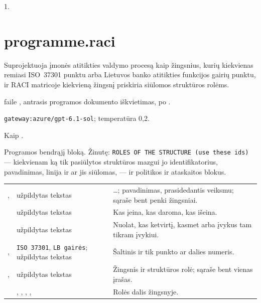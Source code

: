  1.


\section{programme.raci}\label{sec:aprompts:programme-raci}

 Suprojektuoja įmonės atitikties valdymo procesą kaip žingsnius,
kurių kiekvienas remiasi ISO~37301 punktu arba Lietuvos banko atitikties funkcijos gairių
punktu, ir RACI matricoje kiekvieną žingsnį priskiria siūlomos struktūros rolėms.

  faile , antrasis
programos dokumento iškvietimas, po .

 \texttt{gateway:azure/gpt-6.1-sol}; temperatūra 0,2.

 Kaip .

 Programos bendrąjį bloką. Žinutę:
\texttt{ROLES OF THE STRUCTURE (use these ids)} --- kiekvienam ką tik pasiūlytos struktūros
mazgui jo identifikatorius, pavadinimas, linija ir ar jis siūlomas, --- ir
 politikos ir ataskaitos blokus.

\par\nopagebreak
\begin{xltabular}{\textwidth}{@{}L{40mm}L{30mm}Y@{}}
\toprule
{} &  &  \\
\midrule
\endhead
\bottomrule
\endlastfoot
{},  & užpildytas tekstas &  …; pavadinimas, prasidedantis veiksmu; sąraše bent penki žingsniai. \\
 & užpildytas tekstas & Kas įeina, kas daroma, kas išeina. \\
 & užpildytas tekstas & Nuolat, kas ketvirtį, kasmet arba įvykus tam tikram įvykiui. \\
,  & \texttt{ISO 37301}, \texttt{LB gairės}; užpildytas tekstas & Šaltinis ir tik punkto ar dalies numeris. \\
,  & užpildytas tekstas & Žingsnis ir struktūros rolė; sąraše bent vienas įrašas. \\
 & , , , ,  & Rolės dalis žingsnyje. \\
\end{xltabular}

